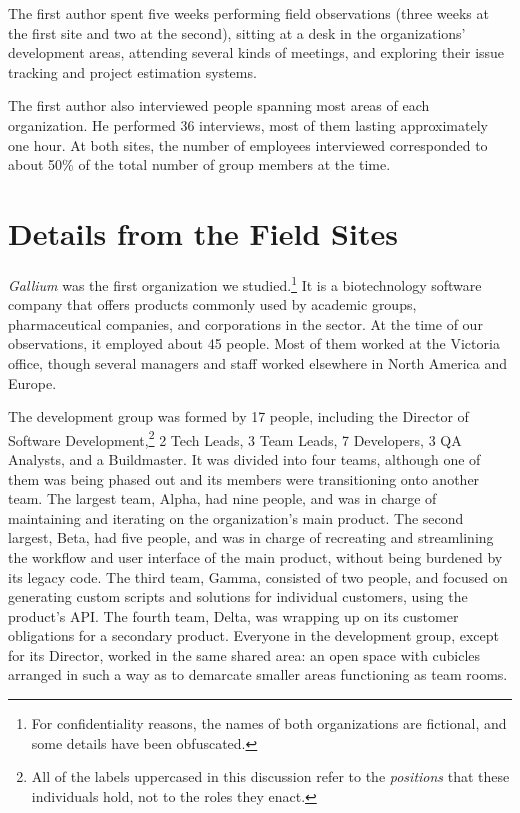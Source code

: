 \documentclass[10pt, conference, compsocconf]{IEEEtran}
\begin{document}
The first author spent five weeks performing field observations (three weeks at the first site and two at the second), sitting at a desk in the organizations' development areas, attending several kinds of meetings, and exploring their issue tracking and project estimation systems.

The first author also interviewed people spanning most areas of each organization. He performed 36 interviews, most of them lasting approximately one hour. At both sites, the number of employees interviewed corresponded to about 50\% of the total number of group members at the time.




\section{Details from the Field Sites}

\emph{Gallium} was the first organization we studied.\footnote{For confidentiality reasons, the names of both organizations are fictional, and some details have been obfuscated.} It is a biotechnology software company that offers products commonly used by academic groups, pharmaceutical companies, and corporations in the sector. At the time of our observations, it employed about 45 people. Most of them worked at the Victoria office, though several managers and staff worked elsewhere in North America and Europe.

The development group was formed by 17 people, including the Director of Software Development,\footnote{All of the labels uppercased in this discussion refer to the \emph{positions} that these individuals hold, not to the roles they enact.} 2 Tech Leads, 3 Team Leads, 7 Developers, 3 QA Analysts, and a Buildmaster. It was divided into four teams, although one of them was being phased out and its members were transitioning onto another team. The largest team, Alpha, had nine people, and was in charge of maintaining and iterating on the organization's main product. The second largest, Beta, had five people, and was in charge of recreating and streamlining the workflow and user interface of the main product, without being burdened by its legacy code. The third team, Gamma, consisted of two people, and focused on generating custom scripts and solutions for individual customers, using the product's API. The fourth team, Delta, was wrapping up on its customer obligations for a secondary product. Everyone in the development group, except for its Director, worked in the same shared area: an open space with cubicles arranged in such a way as to demarcate smaller areas functioning as team rooms.
\end{document}
